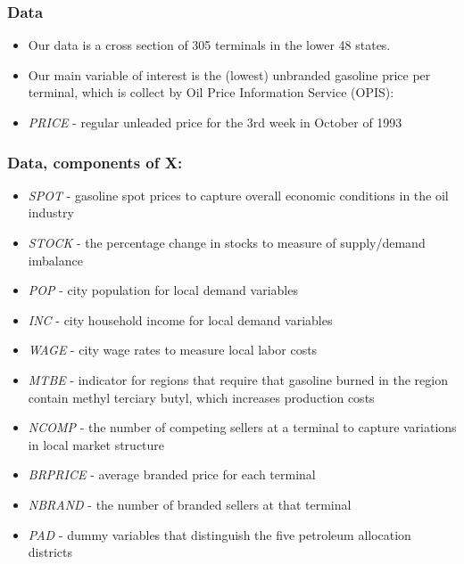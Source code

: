 \documentclass{beamer}
\begin{document}
\begin{frame}
  \frametitle{Data}

  \begin{itemize}
    \item Our data is a cross section of 305 terminals in the lower 48 states.
    \item Our main variable of interest is the (lowest) unbranded gasoline price per terminal, which is collect by Oil Price Information Service (OPIS):

    \item \textit{PRICE} - regular unleaded price for the 3rd week in October of 1993
  \end{itemize}
\end{frame}

\begin{frame}
  \frametitle{Data, components of X:}
  \footnotesize\begin{itemize}
    \item \textit{SPOT} - gasoline spot prices to capture overall economic conditions in the oil industry
    \item \textit{STOCK} - the percentage change in stocks to measure of supply/demand imbalance
    \item \textit{POP} - city population for local demand variables
    \item \textit{INC} - city household income for local demand variables
    \item \textit{WAGE} - city wage rates to measure local labor costs
    \item \textit{MTBE} - indicator for regions that require that gasoline burned in the region contain methyl terciary butyl, which increases production costs
    \item \textit{NCOMP} - the number of competing sellers at a terminal to capture variations in local market structure
    \item \textit{BRPRICE} - average branded price for each terminal
    \item \textit{NBRAND} - the number of branded sellers at that terminal
    \item \textit{PAD} - dummy variables that distinguish the five petroleum allocation districts
  \end{itemize}
\end{frame}
\end{document}
